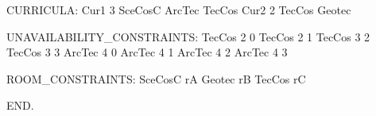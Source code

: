 CURRICULA:
Cur1 3 SceCosC ArcTec TecCos 
Cur2 2 TecCos Geotec 

UNAVAILABILITY_CONSTRAINTS:
TecCos 2 0 
TecCos 2 1 
TecCos 3 2 
TecCos 3 3 
ArcTec 4 0 
ArcTec 4 1 
ArcTec 4 2 
ArcTec 4 3 

ROOM_CONSTRAINTS:
SceCosC rA
Geotec rB
TecCos rC

END.
